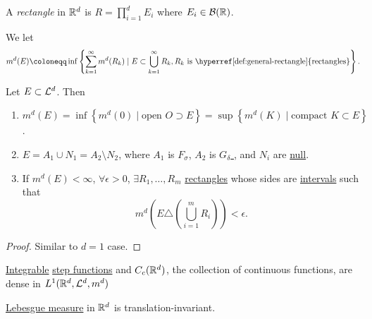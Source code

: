\begin{definition}\label{def:general-rectangle}
	A \emph{rectangle} in \(\mathbb{\MakeUppercase{r}} ^d\) is \(R = \prod\limits_{i=1}^{d} E_{i} \) where \(E_{i}\in \mathcal{\MakeUppercase{b}} (\mathbb{\MakeUppercase{r}} )\).
\end{definition}

\begin{definition}
	We let
	\[
		m^d(E) \coloneqq \inf \left\{\sum\limits_{k=1}^{\infty} m^d(R_{k} )\mid E\subset \bigcup\limits_{k=1}^{\infty} R_{k} , R_{k} \text{ is \hyperref[def:general-rectangle]{rectangles}}\right\}.
	\]
\end{definition}
\begin{theorem}
	Let \(E\subset \mathcal{\MakeUppercase{l}} ^d\). Then
	\begin{enumerate}
		\item \(m^d(E) = \inf \left\{m^d (0) \mid \text{open } O\supset E \right\} = \sup \left\{m^d (K)\mid \text{compact }K\subset E \right\}\).
		\item \(E = A_1 \cup N_1 = A_2 \setminus N_2\), where \(A_1\) is \hyperref[def:F-sigma-set]{\(F_\sigma \)}, \(A_2\) is \hyperref[def:G-delta-set]{\(G_\delta \) }, and \(N_{i} \) are \hyperref[def:mu-null-set]{null}.
		\item If \(m^d(E)<\infty \), \(\forall \epsilon >0\), \(\exists R_1, \ldots , R_m \) \hyperref[def:general-rectangle]{rectangles} whose sides are \underline{intervals} such that
		      \[
			      m^d \left(E\triangle \left(\bigcup\limits_{i=1}^{m} R_{i} \right)\right)< \epsilon .
		      \]
	\end{enumerate}
\end{theorem}
\begin{proof}
	Similar to \(d = 1\) case.
\end{proof}

\begin{theorem}
	\hyperref[def:integrable]{Integrable} \hyperref[def:step-function]{step functions} and \(C_c(\mathbb{\MakeUppercase{r}} ^d)\), the collection
	of continuous functions, are dense in \(L^1(\mathbb{\MakeUppercase{r}} ^d, \mathcal{\MakeUppercase{l}} ^d, m^d)\)
\end{theorem}

\begin{theorem}
	\hyperref[def:Lebesgue-measure]{Lebesgue measure} in \(\mathbb{\MakeUppercase{r}} ^d\) is translation-invariant.
\end{theorem}


